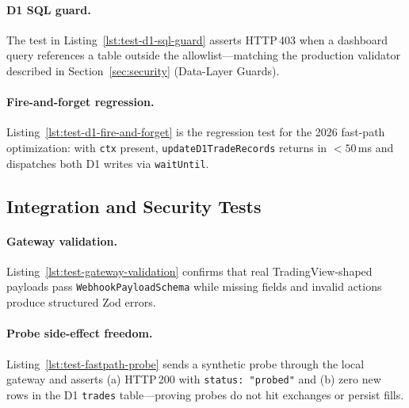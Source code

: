 
\paragraph{D1 SQL guard.} The test in Listing~\ref{lst:test-d1-sql-guard} asserts HTTP\,403 when a dashboard query references a table outside the allowlist---matching the production validator described in Section~\ref{sec:security} (Data-Layer Guards).


\paragraph{Fire-and-forget regression.} Listing~\ref{lst:test-d1-fire-and-forget} is the regression test for the 2026 fast-path optimization: with \texttt{ctx} present, \texttt{updateD1TradeRecords} returns in ${<}50$\,ms and dispatches both D1 writes via \texttt{waitUntil}.


\subsection{Integration and Security Tests}

\paragraph{Gateway validation.} Listing~\ref{lst:test-gateway-validation} confirms that real TradingView-shaped payloads pass \texttt{WebhookPayloadSchema} while missing fields and invalid actions produce structured Zod errors.


\paragraph{Probe side-effect freedom.} Listing~\ref{lst:test-fastpath-probe} sends a synthetic probe through the local gateway and asserts (a) HTTP\,200 with \texttt{status: "probed"} and (b) zero new rows in the D1 \texttt{trades} table---proving probes do not hit exchanges or persist fills.

